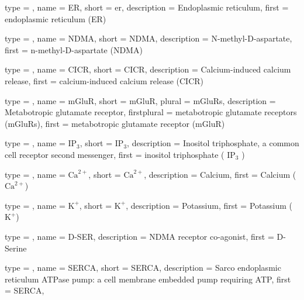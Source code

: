 {
	type        = \acronymtype,
	name        = {ER},
	short       = {er},
	description = {Endoplasmic reticulum},
	first       = {endoplasmic reticulum (ER)}
}

{
	type        = \acronymtype,
	name        = {NDMA},
	short       = {NDMA},
	description = {N-methyl-D-aspartate},
	first       = {n-methyl-D-aspartate (NDMA)}
}

{
	type        = \acronymtype,
	name        = {CICR},
	short       = {CICR},
	description = {Calcium-induced calcium release},
	first       = {calcium-induced calcium release (CICR)}
}

{
	type        = \acronymtype,
	name        = {mGluR},
	short       = {mGluR},
    plural      = {mGluRs},
	description = {Metabotropic glutamate receptor},
	firstplural = {metabotropic glutamate receptors (mGluRs)},
	first       = {metabotropic glutamate receptor (mGluR)}
}

{
	type        = \acronymtype,
	name        = {$\textrm{IP}_3$},
	short       = {$\textrm{IP}_3$},
	description = {Inositol triphosphate, a common cell receptor second messenger},
	first = {inositol triphosphate ( $\textrm{IP}_3$ )}
}

{
	type        = \acronymtype,
    name        = {$\textrm{Ca}^{2+}$},
	short       = {$\textrm{Ca}^{2+}$},
	description = {Calcium},
	first = {Calcium ($\textrm{Ca}^{2+}$)}
}

{
	type        = \acronymtype,
	name        = {$\textrm{K}^{+}$},
	short       = {$\textrm{K}^{+}$},
	description = {Potassium},
	first = {Potassium ($\textrm{K}^{+}$)}
}

{
	type        = \acronymtype,
	name        = {D-SER},
	description = {NDMA receptor co-agonist},
	first       = {D-Serine}
}

{
	type        = \acronymtype,
	name        = {SERCA},
	short       = {SERCA},
	description = {Sarco endoplasmic reticulum ATPase pump: a cell membrane embedded pump requiring ATP},
  	first = {SERCA},   
}

